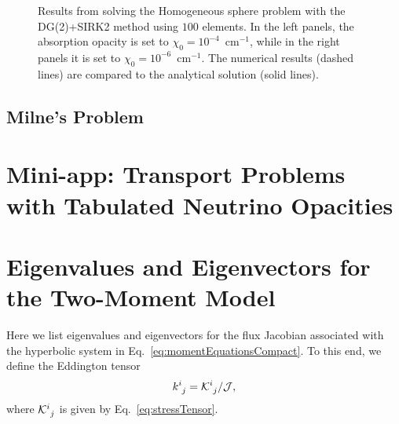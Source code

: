 \documentclass[10pt,preprint]{aastex}
\begin{document}
\begin{figure}
\begin{center}
\begin{tabular}{cc}
    \end{tabular}
  \end{center}
  \caption{Results from solving the Homogeneous sphere problem with the DG(2)+SIRK2 method using $100$ elements.  
  In the left panels, the absorption opacity is set to $\chi_{0}=10^{-4}$~cm$^{-1}$, while in the right panels it is set to $\chi_{0}=10^{-6}$~cm$^{-1}$.  
  The numerical results (dashed lines) are compared to the analytical solution (solid lines).}
  \label{fig:homogeneousSphere1D}
\end{figure}

\subsection{Milne's Problem}

\section{Mini-app: Transport Problems with Tabulated Neutrino Opacities}




\appendix

\clearpage

\section{Eigenvalues and Eigenvectors for the Two-Moment Model}
\label{sec:eigenstructure}

Here we list eigenvalues and eigenvectors for the flux Jacobian associated with the hyperbolic system in Eq.~\eqref{eq:momentEquationsCompact}.  
To this end, we define the Eddington tensor
\begin{equation}
  k^{i}_{~j}=\mathcal{K}^{i}_{~j}/\mathcal{J},
\end{equation}
where $\mathcal{K}^{i}_{~j}$ is given by Eq.~\eqref{eq:stressTensor}.  
\end{document}
